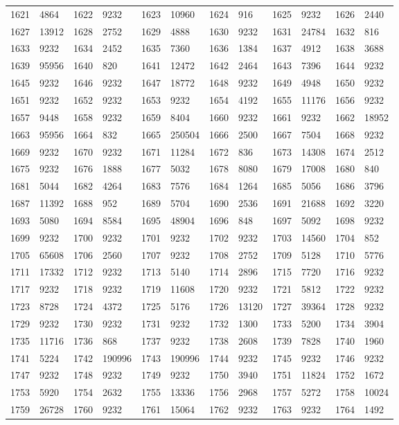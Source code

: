 \begin{longtable}{llllllllllll}
1621 & 4864&1622 &9232&1623& 10960&1624 &916&1625 &9232&1626& 2440\\
1627 & 13912&1628 &2752&1629& 4888&1630 &9232&1631 &24784&1632& 816\\
1633 & 9232&1634 &2452&1635& 7360&1636 &1384&1637 &4912&1638& 3688\\
1639 & 95956&1640 &820&1641& 12472&1642 &2464&1643 &7396&1644& 9232\\
1645 & 9232&1646 &9232&1647& 18772&1648 &9232&1649 &4948&1650& 9232\\
1651 & 9232&1652 &9232&1653& 9232&1654 &4192&1655 &11176&1656& 9232\\
1657 & 9448&1658 &9232&1659& 8404&1660 &9232&1661 &9232&1662& 18952\\
1663 & 95956&1664 &832&1665& 250504&1666 &2500&1667 &7504&1668& 9232\\
1669 & 9232&1670 &9232&1671& 11284&1672 &836&1673 &14308&1674& 2512\\
1675 & 9232&1676 &1888&1677& 5032&1678 &8080&1679 &17008&1680& 840\\
1681 & 5044&1682 &4264&1683& 7576&1684 &1264&1685 &5056&1686& 3796\\
1687 & 11392&1688 &952&1689& 5704&1690 &2536&1691 &21688&1692& 3220\\
1693 & 5080&1694 &8584&1695& 48904&1696 &848&1697 &5092&1698& 9232\\
1699 & 9232&1700 &9232&1701& 9232&1702 &9232&1703 &14560&1704& 852\\
1705 & 65608&1706 &2560&1707& 9232&1708 &2752&1709 &5128&1710& 5776\\
1711 & 17332&1712 &9232&1713& 5140&1714 &2896&1715 &7720&1716& 9232\\
1717 & 9232&1718 &9232&1719& 11608&1720 &9232&1721 &5812&1722& 9232\\
1723 & 8728&1724 &4372&1725& 5176&1726 &13120&1727 &39364&1728& 9232\\
1729 & 9232&1730 &9232&1731& 9232&1732 &1300&1733 &5200&1734& 3904\\
1735 & 11716&1736 &868&1737& 9232&1738 &2608&1739 &7828&1740& 1960\\
1741 & 5224&1742 &190996&1743& 190996&1744 &9232&1745 &9232&1746& 9232\\
1747 & 9232&1748 &9232&1749& 9232&1750 &3940&1751 &11824&1752& 1672\\
1753 & 5920&1754 &2632&1755& 13336&1756 &2968&1757 &5272&1758& 10024\\
1759 & 26728&1760 &9232&1761& 15064&1762 &9232&1763 &9232&1764& 1492\\

\end{longtable}
